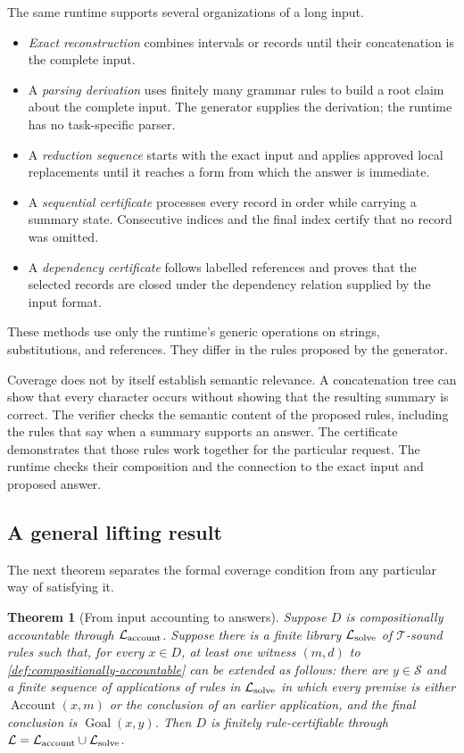 \documentclass[11pt,twoside]{article}
\newtheorem{theorem}{Theorem}[section]
\theoremstyle{definition}
\newcommand{\Stext}{\mathcal S}
\newcommand{\True}{\mathcal T}
\newcommand{\Lib}{\mathcal L}
\newcommand{\Goal}{\operatorname{Goal}}
\newcommand{\Account}{\operatorname{Account}}
\begin{document}
The same runtime supports several organizations of a long input.
\begin{itemize}[leftmargin=*]
\item \emph{Exact reconstruction} combines intervals or records until their
concatenation is the complete input.
\item A \emph{parsing derivation} uses finitely many grammar rules to build a
root claim about the complete input. The generator supplies the derivation;
the runtime has no task-specific parser.
\item A \emph{reduction sequence} starts with the exact input and applies
approved local replacements until it reaches a form from which the answer is
immediate.
\item A \emph{sequential certificate} processes every record in order while
carrying a summary state. Consecutive indices and the final index certify that
no record was omitted.
\item A \emph{dependency certificate} follows labelled references and proves
that the selected records are closed under the dependency relation supplied
by the input format.
\end{itemize}
These methods use only the runtime's generic operations on strings,
substitutions, and references. They differ in the rules proposed by the
generator.

Coverage does not by itself establish semantic relevance. A concatenation
tree can show that every character occurs without showing that the resulting
summary is correct. The verifier checks the semantic content of the proposed
rules, including the rules that say when a summary supports an answer. The
certificate demonstrates that those rules work together for the particular
request. The runtime checks their composition and the connection to the exact
input and proposed answer.

\subsection{A general lifting result}

The next theorem separates the formal coverage condition from any particular
way of satisfying it.

\begin{theorem}[From input accounting to answers]
\label{thm:accounted-input}
Suppose $D$ is compositionally accountable through
$\Lib_{\rm account}$. Suppose there is a finite library $\Lib_{\rm solve}$
of $\True$-sound rules such that, for every $x\in D$, at least one witness $(m,d)$ to
\cref{def:compositionally-accountable} can be extended as follows: there are
$y\in\Stext$ and a finite sequence of applications of rules in
$\Lib_{\rm solve}$ in which every premise is either $\Account(x,m)$ or the
conclusion of an earlier application, and the final conclusion is
$\Goal(x,y)$.
Then $D$ is finitely rule-certifiable through
$\Lib=\Lib_{\rm account}\cup\Lib_{\rm solve}$.
\end{theorem}
\end{document}
